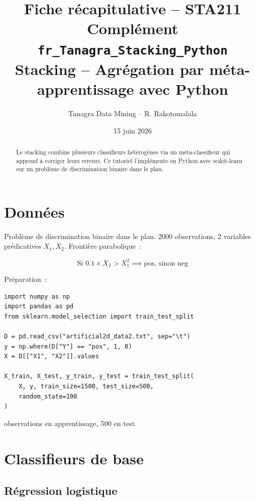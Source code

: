\documentclass[a4paper,11pt]{article}
\title{\textbf{Fiche r\'ecapitulative -- STA211}\\[4pt]
\large Compl\'ement \texttt{fr\_Tanagra\_Stacking\_Python} \\[2pt]
\small Stacking -- Agr\'egation par m\'eta-apprentissage avec Python}
\author{Tanagra Data Mining -- R. Rakotomalala}
\date{15 juin 2026}
\begin{document}
\maketitle
\thispagestyle{empty}

\begin{abstract}
Le stacking combine plusieurs classifieurs h\'et\'erog\`enes via un
m\'eta-classifieur qui apprend \`a corriger leurs erreurs. Ce tutoriel
l'impl\'emente en Python avec scikit-learn sur un probl\`eme de
discrimination binaire dans le plan.
\end{abstract}

\vfill
\tableofcontents
\newpage

\section{Donn\'ees}

Probl\`eme de discrimination binaire dans le plan. 2000 observations,
2 variables pr\'edicatives $X_1, X_2$. Fronti\`ere parabolique~:

\[
\text{Si } 0.1 \times X_2 > X_1^2 \implies \text{pos, sinon neg}
\]

Pr\'eparation~:
\begin{lstlisting}
import numpy as np
import pandas as pd
from sklearn.model_selection import train_test_split

D = pd.read_csv("artificial2d_data2.txt", sep="\t")
y = np.where(D["Y"] == "pos", 1, 0)
X = D[["X1", "X2"]].values

X_train, X_test, y_train, y_test = train_test_split(
    X, y, train_size=1500, test_size=500,
    random_state=100
)
\end{lstlisting}

 observations en apprentissage, 500 en test.

\section{Classifieurs de base}

\subsection{R\'egression logistique}
\end{document}
